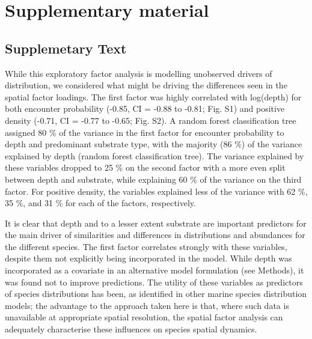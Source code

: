 \documentclass[12pt]{article}
\newcommand{\beginsupplement}{%
		        \setcounter{table}{0}
		        \renewcommand{\thetable}{S\arabic{table}}%
		        \setcounter{figure}{0}
		        \renewcommand{\thefigure}{S\arabic{figure}}%
			     }
\begin{document}
\clearpage

\section*{Supplementary material}

\beginsupplement

\begin{linenumbers}

\section*{Supplemetary Text}

While this exploratory factor analysis is modelling unobserved drivers of
distribution, we considered what might be driving the differences seen in the
spatial factor loadings. The first factor was highly correlated with log(depth)
for both encounter probability (-0.85, CI = -0.88 to -0.81; Fig. S1) and
positive density (-0.71, CI = -0.77 to -0.65; Fig. S2).  A random forest
classification tree assigned  80 \% of the variance in the first factor for
encounter probability to depth and predominant substrate type, with the
majority (86 \%) of the variance explained by depth (random forest
classification tree). The variance explained by these variables dropped to 25
\% on the second factor with a more even split between depth and substrate,
while explaining 60 \% of the variance on the third factor.  For positive
density, the variables explained less of the variance with 62 \%, 35 \%, and 31
\% for each of the factors, respectively.

It is clear that depth and to a lesser extent substrate are important
predictors for the main driver of similarities and differences in distributions
and abundances for the different species.  The first factor correlates strongly
with these variables, despite them not explicitly being incorporated in the
model. While depth was incorporated as a covariate in an alternative model
formulation (see Methods), it was found not to improve predictions. The utility
of these variables as predictors of species distributions has been, as
identified in other marine species distribution models\cite{Robinson2011}; the
advantage to the approach taken here is that, where such data is unavailable at
appropriate spatial resolution, the spatial factor analysis can adequately
characterise these influences on species spatial dynamics.


\end{linenumbers}
\end{document}
